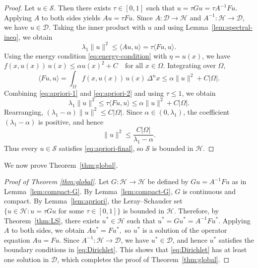 \documentclass{article}
\numberwithin{equation}{section}
\numberwithin{theorem}{section}
\begin{document}
\begin{proof}
Let $u\in\mathcal{S}$. Then there exists $\tau\in[0,1]$ such that
$u = \tau Gu = \tau A^{-1}Fu.$
Applying $A$ to both sides yields
$Au = \tau Fu.$
Since $A\colon \mathscr{D}\to \mathscr{H}$ and $A^{-1}\colon \mathscr{H}\to \mathscr{D}$, we have $u\in \mathscr{D}$. Taking the inner product with $u$ and using Lemma~\ref{lem:spectral-ineq}, we obtain
\begin{equation}\label{eq:apriori-1}
\lambda_1 \|u\|^2 \le \langle Au,u\rangle = \tau \langle Fu,u\rangle.
\end{equation}
Using the energy condition \eqref{eq:energy-condition} with $\eta = u(x)$, we have
$f(x,u(x))\,u(x) \le \alpha u(x)^2 + C
\quad \text{for all } x\in\Omega.$
Integrating over $\Omega$,
\begin{equation}\label{eq:apriori-2}
\langle Fu,u\rangle
= \int_{\Omega} f(x,u(x))\,u(x)\,\Delta^n x
\le \alpha \|u\|^2 + C |\Omega|.
\end{equation}
Combining \eqref{eq:apriori-1} and \eqref{eq:apriori-2} and using $\tau\le 1$, we obtain
\[
\lambda_1 \|u\|^2
\le \tau \langle Fu,u\rangle
\le \alpha \|u\|^2 + C |\Omega|.
\]
Rearranging,
$(\lambda_1 - \alpha) \|u\|^2 \le C |\Omega|.$
Since $\alpha\in(0,\lambda_1)$, the coefficient $(\lambda_1-\alpha)$ is positive, and hence
\begin{equation}\label{eq:apriori-final}
\|u\|^2 \le \frac{C |\Omega|}{\lambda_1 - \alpha}.
\end{equation}
Thus every $u\in\mathcal{S}$ satisfies \eqref{eq:apriori-final}, so $\mathcal{S}$ is bounded in $\mathscr{H}$.
\end{proof}
We now prove Theorem~\ref{thm:global}.
\begin{proof}[Proof of Theorem \ref{thm:global}]
Let $G\colon \mathscr{H}\to \mathscr{H}$ be defined by $Gu = A^{-1}Fu$ as in Lemma~\ref{lem:compact-G}. By Lemma~\ref{lem:compact-G}, $G$ is continuous and compact. By Lemma~\ref{lem:apriori}, the Leray--Schauder set
$\{u\in \mathscr{H} \colon u = \tau Gu \text{ for some } \tau\in[0,1]\}$
is bounded in $\mathscr{H}$. Therefore, by Theorem~\ref{thm:LS}, there exists $u^*\in \mathscr{H}$ such that
$u^* = Gu^* = A^{-1}F u^*.$
Applying $A$ to both sides, we obtain
$Au^* = Fu^*,$
so $u^*$ is a solution of the operator equation
$Au = Fu.$
Since $A^{-1}\colon \mathscr{H}\to \mathscr{D}$, we have $u^*\in \mathscr{D}$, and hence $u^*$ satisfies the boundary conditions in \eqref{eq:Dirichlet}. This shows that \eqref{eq:Dirichlet} has at least one solution in $\mathscr{D}$, which completes the proof of Theorem~\ref{thm:global}.
\end{proof}
\end{document}
